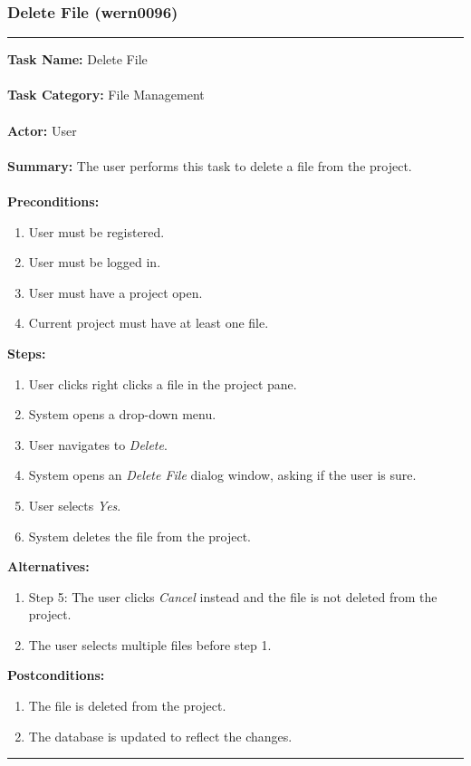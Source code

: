 \documentclass[11pt]{report}
\begin{document}
\subsubsection{Delete File (wern0096)}
\vspace{2pt}
\hrule
\vspace{8pt}
	\noindent\textbf{Task Name:} Delete File \\ \\
	\textbf{Task Category:} File Management \\ \\
	\textbf{Actor:} User \\ \\
	\textbf{Summary:} The user performs this task to delete a file from the project. \\ \\
	\textbf{Preconditions:} 
	\begin{enumerate}
		\item User must be registered.
		\item User must be logged in.
		\item User must have a project open.
		\item Current project must have at least one file.
	\end{enumerate}
	\textbf{Steps:}
	\begin{enumerate}
		\item User clicks right clicks a file in the project pane.
		\item System opens a drop-down menu.
		\item User navigates to \textit{Delete}.
		\item System opens an \textit{Delete File} dialog window, asking if the user is sure.
		\item User selects \textit{Yes}.
		\item System deletes the file from the project.
	\end{enumerate}
	\textbf{Alternatives:} 
	\begin{enumerate}
		\item Step 5: The user clicks \textit{Cancel} instead and the file is not deleted from the project.
		\item The user selects multiple files before step 1.
	\end{enumerate}
	\textbf{Postconditions:}
	\begin{enumerate}
		\item The file is deleted from the project.
		\item The database is updated to reflect the changes.
	\end{enumerate}
\vspace{8pt} 
\hrule
\newpage
\end{document}
